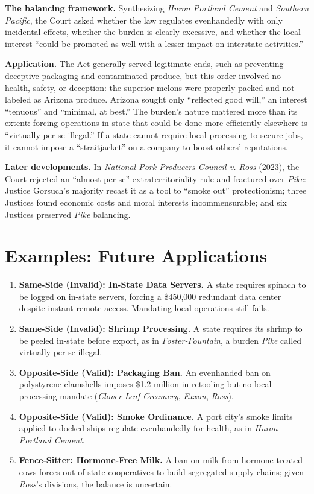 \documentclass[12pt]{article}
\begin{document}
\textbf{The balancing framework.} Synthesizing \textit{Huron Portland Cement} and \textit{Southern Pacific}, the Court asked whether the law regulates evenhandedly with only incidental effects, whether the burden is clearly excessive, and whether the local interest ``could be promoted as well with a lesser impact on interstate activities.''

\textbf{Application.} The Act generally served legitimate ends, such as preventing deceptive packaging and contaminated produce, but this order involved no health, safety, or deception: the superior melons were properly packed and not labeled as Arizona produce. Arizona sought only ``reflected good will,'' an interest ``tenuous'' and ``minimal, at best.'' The burden's nature mattered more than its extent: forcing operations in-state that could be done more efficiently elsewhere is ``virtually per se illegal.'' If a state cannot require local processing to secure jobs, it cannot impose a ``straitjacket'' on a company to boost others' reputations.

\textbf{Later developments.} In \textit{National Pork Producers Council v. Ross} (2023), the Court rejected an ``almost per se'' extraterritoriality rule and fractured over \textit{Pike}: Justice Gorsuch's majority recast it as a tool to ``smoke out'' protectionism; three Justices found economic costs and moral interests incommensurable; and six Justices preserved \textit{Pike} balancing.

\section{Examples: Future Applications}

\begin{enumerate}
\item \textbf{Same-Side (Invalid): In-State Data Servers.} A state requires spinach to be logged on in-state servers, forcing a \$450,000 redundant data center despite instant remote access. Mandating local operations still fails.
\item \textbf{Same-Side (Invalid): Shrimp Processing.} A state requires its shrimp to be peeled in-state before export, as in \textit{Foster-Fountain}, a burden \textit{Pike} called virtually per se illegal.
\item \textbf{Opposite-Side (Valid): Packaging Ban.} An evenhanded ban on polystyrene clamshells imposes \$1.2 million in retooling but no local-processing mandate (\textit{Clover Leaf Creamery}, \textit{Exxon}, \textit{Ross}).
\item \textbf{Opposite-Side (Valid): Smoke Ordinance.} A port city's smoke limits applied to docked ships regulate evenhandedly for health, as in \textit{Huron Portland Cement}.
\item \textbf{Fence-Sitter: Hormone-Free Milk.} A ban on milk from hormone-treated cows forces out-of-state cooperatives to build segregated supply chains; given \textit{Ross}'s divisions, the balance is uncertain.
\end{enumerate}
\end{document}
